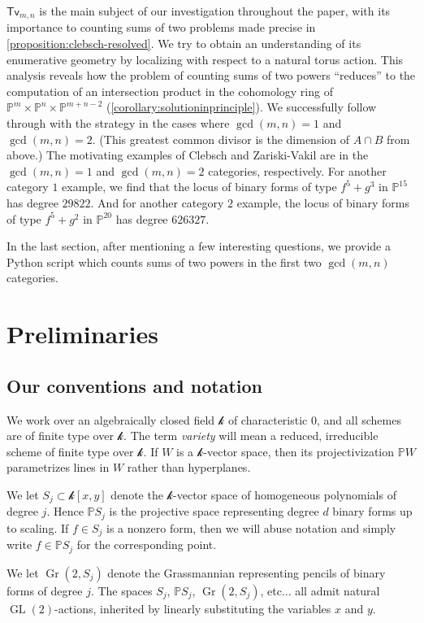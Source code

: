 \documentclass[12pt]{article}
\theoremstyle{plain}
\theoremstyle{remark}
\renewcommand{\P}{\mathbb{P}}
\newcommand{\Gr}{\operatorname{Gr}}
\newcommand{\GL}{\operatorname{GL}}
\newcommand{\transvectant}{\mathsf{Tv}}
\renewcommand{\k}{\mathscr{k}}
\begin{document}
$\transvectant_{m,n}$ is the main subject of our investigation throughout the paper, with its importance to counting sums of two problems made precise in \ref{proposition:clebsch-resolved}.  We try to obtain an understanding of its enumerative geometry by localizing with respect to a natural torus action.  This analysis reveals how the problem of counting sums of two powers ``reduces'' to the computation of an intersection product in the cohomology ring of $\P^{m} \times \P^{n} \times \P^{m+n-2}$ (\ref{corollary:solutioninprinciple}).  We successfully follow through with the strategy in the cases where $\gcd(m,n) = 1$ and $\gcd(m,n) = 2$.  (This greatest common divisor is the dimension of $A \cap B$ from above.)  The motivating examples of Clebsch and Zariski-Vakil are in the $\gcd(m,n) = 1$ and $\gcd(m,n) = 2$ categories, respectively.  For another category $1$ example, we find that the locus of binary forms of type $f^{5} + g^{3}$ in $\P^{15}$ has degree $29822$.  And for another category $2$ example, the locus of binary forms of type $f^{5} + g^{2}$ in $\P^{20}$ has degree $626327$.

In the last section, after mentioning a few interesting questions, we provide a Python script which counts sums of two powers in the first two $\gcd(m,n)$ categories.


\section{Preliminaries}

    \subsection{Our conventions and notation} We work over an algebraically closed field $\k$ of characteristic $0$, and all schemes are of finite type over $\k$. The term {\sl variety} will mean a reduced, irreducible scheme of finite type over $\k$. If $W$ is a $\k$-vector space, then its projectivization $\P W$ parametrizes lines in $W$ rather than hyperplanes.

    We let $S_j \subset \k[x,y]$ denote the $\k$-vector space of homogeneous polynomials of degree $j$.  Hence $\P S_j$ is the projective space representing degree $d$ binary forms up to scaling.  If $f \in S_j$ is a nonzero form, then we will abuse notation and simply write $f \in \P S_j$ for the corresponding point.


    We let $\Gr(2,S_j)$ denote the Grassmannian representing pencils of binary forms of degree $j$. The spaces $S_{j}$, $\P S_{j}$, $\Gr(2,S_{j})$, etc... all admit natural $\GL(2)$-actions, inherited by linearly substituting the variables $x$ and $y$.
\end{document}
